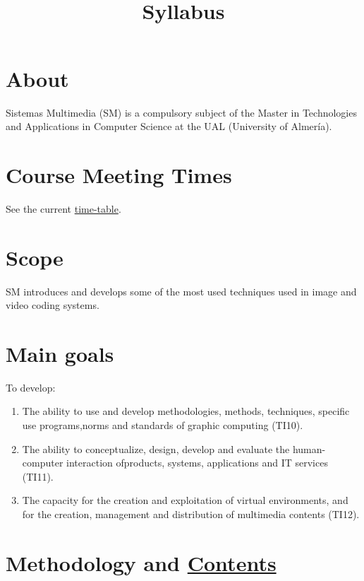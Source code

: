 

\title{\SM{} \\ Syllabus}

\maketitle

\section{About}

Sistemas Multimedia (SM) is a compulsory subject of the Master in
Technologies and Applications in Computer Science at the UAL
(University of Almería).

\section{Course Meeting Times}

See the current \href{https://www.ual.es/estudios/masteres/presentacion/plandeestudios/asignatura/7114/71142105}{time-table}.

\section{Scope}

SM introduces and develops some of the most used techniques used in
image and video coding systems.

\section{Main goals}

To develop:
\begin{enumerate}
\item The ability to use and develop methodologies, methods,
  techniques, specific use programs,norms and standards of graphic
  computing (TI10).
\item The ability to conceptualize, design, develop and evaluate the
  human-computer interaction ofproducts, systems, applications and IT
  services (TI11).
\item The capacity for the creation and exploitation of virtual
  environments, and for the creation, management and distribution of
  multimedia contents (TI12).
\end{enumerate}

\section{Methodology and \href{https://sistemas-multimedia.github.io/contents/}{Contents}}

